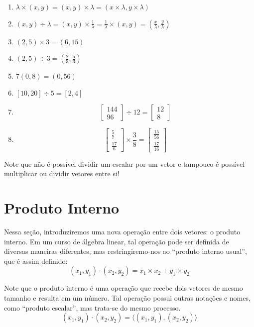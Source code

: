 \documentclass[
  portuguese,
  letterpaper,
  DIV=11,
  numbers=noendperiod]{scrreport}
\providecommand{\tightlist}{%
  \setlength{\itemsep}{0pt}\setlength{\parskip}{0pt}}
\begin{document}
\begin{enumerate}
\def\labelenumi{\arabic{enumi}.}
\tightlist
\item
  \(\lambda \times (x,y) = (x,y) \times \lambda = (x \times \lambda, y \times \lambda)\)
\item
  \((x,y) \div \lambda = (x,y) \times \frac{1}{\lambda} = \frac{1}{\lambda} \times (x,y) = (\frac{x}{\lambda}, \frac{y}{\lambda})\)
\item
  \((2,5) \times 3 = (6,15)\)
\item
  \((2,5) \div 3 = (\frac{2}{3}, \frac{5}{3})\)
\item
  \(7(0, 8) = (0,56)\)
\item
  \([10, 20] \div 5 = [2, 4]\)
\item
  \[
  \begin{bmatrix} 144  \\  96 \end{bmatrix} \div
  12=
  \begin{bmatrix} 12  \\  8 \end{bmatrix}
  \]
\item
  \[
  \begin{bmatrix} \frac{5}{7}  \\  \frac{17}{6} \end{bmatrix} \times
  \frac{3}{8} =
  \begin{bmatrix} \frac{15}{56}  \\  \frac{17}{16} \end{bmatrix}
  \]
\end{enumerate}

Note que não é possível dividir um escalar por um vetor e tampouco é
possível multiplicar ou dividir vetores entre si!

\section{Produto Interno}\label{produto-interno}

Nessa seção, introduziremos uma nova operação entre dois vetores: o
produto interno. Em um curso de álgebra linear, tal operação pode ser
definida de diversas maneiras diferentes, mas restringiremo-nos ao
``produto interno usual'', que é assim definido: \[
(x_1, y_1) \cdot (x_2, y_2) = x_1 \times x_2 + y_1 \times y_2
\]

Note que o produto interno é uma operação que recebe dois vetores de
mesmo tamanho e resulta em um número. Tal operação possui outras
notações e nomes, como ``produto escalar'', mas trata-se do mesmo
processo. \[
(x_1, y_1) \cdot (x_2, y_2) = \langle (x_1, y_1),(x_2, y_2) \rangle
\]
\end{document}
